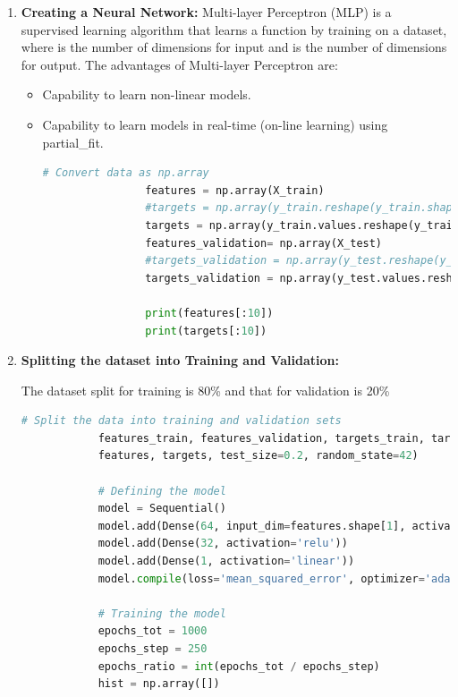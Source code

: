 \begin{enumerate}
	
	\item \textbf{Creating a Neural Network:}
	Multi-layer Perceptron (MLP) is a supervised learning algorithm that learns a function by training on a dataset, where is the number of dimensions for input and is the number of dimensions for output. The advantages of Multi-layer Perceptron are:
		\begin{itemize}
			\item Capability to learn non-linear models.
	
			\item Capability to learn models in real-time (on-line learning) using partial\_fit.
			
			 \begin{lstlisting}[language=Python]
				# Convert data as np.array
				features = np.array(X_train)
				#targets = np.array(y_train.reshape(y_train.shape[0],1))
				targets = np.array(y_train.values.reshape(y_train.shape[0],1))
				features_validation= np.array(X_test)
				#targets_validation = np.array(y_test.reshape(y_test.shape[0],1))
				targets_validation = np.array(y_test.values.reshape(y_test.shape[0],1))
				
				print(features[:10])
				print(targets[:10])
			\end{lstlisting}
			
		\end{itemize}
	
		\item \textbf{Splitting the dataset into Training and Validation:}
		
		The dataset split for training is 80\% and that for validation is 20\%
		
		 \begin{lstlisting}[language=Python]
			# Split the data into training and validation sets
			features_train, features_validation, targets_train, targets_validation = train_test_split(
			features, targets, test_size=0.2, random_state=42)
			
			# Defining the model
			model = Sequential()
			model.add(Dense(64, input_dim=features.shape[1], activation='relu'))
			model.add(Dense(32, activation='relu'))
			model.add(Dense(1, activation='linear'))
			model.compile(loss='mean_squared_error', optimizer='adam', metrics=['mean_squared_error'])
			
			# Training the model
			epochs_tot = 1000
			epochs_step = 250
			epochs_ratio = int(epochs_tot / epochs_step)
			hist = np.array([])
			

\end{lstlisting}
\end{enumerate}
